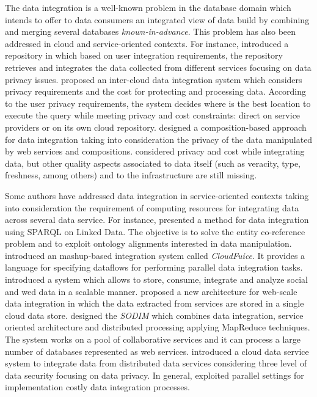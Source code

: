 The data integration is a well-known problem in the database domain which intends to offer to data consumers an integrated view of data 
build by combining and merging several databases \textit{known-in-advance}. 
This problem has also been addressed in cloud and service-oriented contexts.
%
For instance, \cite{YauY08} introduced a repository in which based on user 
integration requirements, the repository retrieves and integrates the data
collected from different services focusing on data privacy issues. 
%
\cite{Tian2010} proposed an inter-cloud data integration system which considers 
privacy requirements and the cost for protecting and processing data. 
According to the user privacy requirements, the system decides where is the best
location to execute the query while meeting privacy and cost constraints:
direct on service providers or on its own cloud repository.
%
\cite{benslimane2013} designed a composition-based approach for data integration
taking into consideration the privacy of the data manipulated by web services and 
compositions.
%
\cite{YauY08,Tian2010,benslimane2013} considered privacy and cost while integrating data, but 
other quality aspects associated to data itself (such as veracity, type, freshness,
among others) and to the infrastructure are still missing.
%

Some authors have addressed data integration in service-oriented contexts
taking into consideration the requirement of computing resources for integrating data
across several data service.
%
For instance, \cite{Correndo2010} presented a method for data integration using SPARQL
on Linked Data. The objective is to solve the entity co-reference problem 
and to exploit ontology alignments interested in data manipulation. 
%
\cite{Thor:2011} introduced an mashup-based integration system called \textit{CloudFuice}.
It provides a language for specifying dataflows for performing parallel data integration
tasks.	
%
\cite{Alsubaiee:2012} introduced a system which allows to store, consume, integrate and
analyze social and wed data in a scalable manner.
\cite{Mubeen2012} proposed a new architecture for web-scale data integration in which
the data extracted from services are stored in a single cloud data store.
%
\cite{ElSheikh2013} designed the \textit{SODIM} which combines data integration,
service oriented architecture and distributed processing applying MapReduce techniques. 
The system works on a pool of collaborative services and it can process a large number 
of databases represented as web services. 
\cite{Hong2014} introduced a cloud data service system to integrate data from distributed
data services considering three level of data security focusing on data privacy.
In general, \cite{Correndo2010,Thor:2011,Alsubaiee:2012,Mubeen2012,ElSheikh2013,Hong2014}
exploited parallel settings for implementation costly data integration processes.

